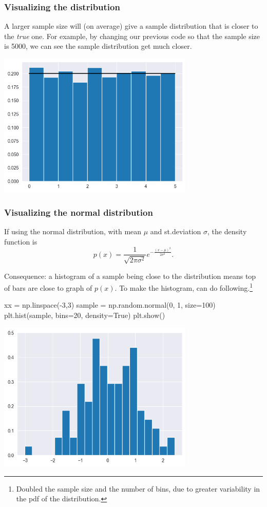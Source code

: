 \documentclass{beamer}
\newenvironment{codeblock}
    {\hfill\begin{beamerboxesrounded}[lower=codecol, width=0.8\textwidth]
    \medskip

    }
    { 
    \end{beamerboxesrounded}\hfill
    }
\theoremstyle{example}
\begin{document}
\begin{frame}[fragile]
\frametitle{Visualizing the distribution}

A larger sample size will (on average) give a sample distribution that is closer to the \emph{true} one. For example, by changing our previous code so that the sample size is 5000, we can see the sample distribution get much closer.

\includegraphics[width=0.7\textwidth]{histogram_of_sample2.png}

\end{frame}

\begin{frame}[fragile]
\frametitle{Visualizing the normal distribution}
If using the normal distribution, with mean $\mu$ and st.deviation $\sigma$, the density function is \[p(x) = \frac{1}{\sqrt{2\pi\sigma^2}}e^{-\frac{(x-\mu)^2}{2\sigma^2}}.\]

Consequence: a histogram of a sample being close to the distribution means top of bars are close to graph of $p(x)$. To make the histogram, can do following.\footnote{Doubled the sample size and the number of bins, due to greater variability in the pdf of the distribution.}


\begin{codeblock}

\begin{python}
xx = np.linspace(-3,3)
sample = np.random.normal(0, 1, size=100)
plt.hist(sample, bins=20, density=True)
plt.show()
\end{python}

\end{codeblock}

\includegraphics[width=0.7\textwidth]{histogram_of_sample3.png}

\end{frame}
\end{document}
